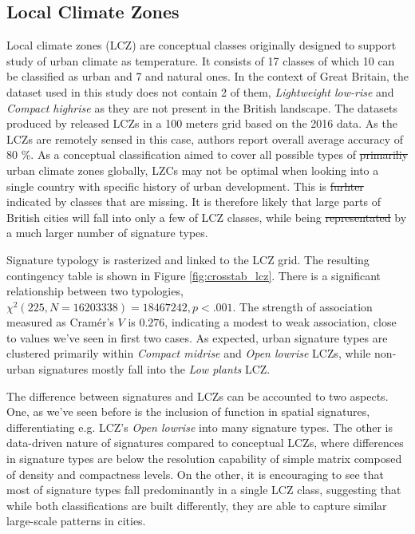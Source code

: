 \documentclass[fleqn,10pt]{wlscirep}
\providecommand{\DIFadd}[1]{{\protect\color{blue}\uwave{#1}}} %
\providecommand{\DIFdel}[1]{{\protect\color{red}\sout{#1}}}                      %
\providecommand{\DIFaddbegin}{} %
\providecommand{\DIFaddend}{} %
\providecommand{\DIFdelbegin}{} %
\providecommand{\DIFdelend}{} %
\begin{document}
\subsection*{Local Climate Zones}
Local climate zones (LCZ) are conceptual classes originally designed to support study of urban
climate as temperature. It consists of 17 classes of which 10 can be classified as urban
and 7 and natural ones. In the context of Great Britain, the dataset used in this study
does not contain 2 of them, \textit{Lightweight low-rise} and \textit{Compact highrise}
as they are not present in the British landscape. The datasets produced by
\cite{demuzere2019mapping} released LCZs in a 100 meters grid based on the 2016 data. As
the LCZs are remotely sensed in this case, authors report overall average accuracy of 80 \%.
As a conceptual classification aimed to cover all possible types of \DIFdelbegin \DIFdel{primariliy }\DIFdelend \DIFaddbegin \DIFadd{primarily }\DIFaddend urban climate zones globally,
LZCs may not be optimal when looking into a single country with specific history of urban
development. This is \DIFdelbegin \DIFdel{furhter }\DIFdelend \DIFaddbegin \DIFadd{further }\DIFaddend indicated by classes that are missing. It is therefore likely
that large parts of British cities will fall into only a few of LCZ classes, while being \DIFdelbegin \DIFdel{representated
}\DIFdelend \DIFaddbegin \DIFadd{represented
}\DIFaddend by a much larger number of signature types.

Signature typology is rasterized and linked to the LCZ grid.
The resulting contingency table is shown in Figure \ref{fig:crosstab_lcz}. There is a
significant relationship between two typologies, $\chi^{2} (225, N = 16203338) = 18467242,
p < .001$. The strength of association measured as Cramér's $V$ is $0.276$, indicating
a modest to weak association, close to values we've seen in first two cases. As expected,
urban signature types are clustered primarily within \textit{Compact midrise} and
\textit{Open lowrise} LCZs, while non-urban signatures mostly fall into the \textit{Low plants} LCZ.

The difference between signatures and LCZs can be accounted to two aspects. One, as we've seen
before is the inclusion of function in spatial signatures, differentiating e.g. LCZ's \textit{Open lowrise} into
many signature types. The other is data-driven nature of signatures compared to conceptual LCZs,
where differences in signature types are below the resolution capability of simple matrix composed of
density and compactness levels. On the other, it is encouraging to see that most of signature types
fall predominantly in a single LCZ class, suggesting that while both classifications are built differently,
they are able to capture similar large-scale patterns in cities.
\end{document}
